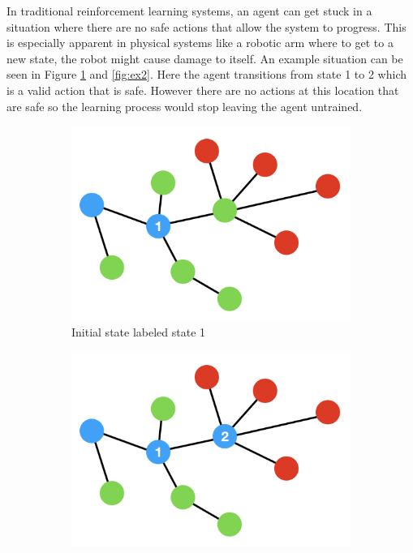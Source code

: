 \documentclass[acmsmall,review,authorversion]{acmart}
\begin{document}
In traditional reinforcement learning systems, an agent can get stuck in a situation where there are no safe actions that allow the system to progress. This is especially apparent in physical systems like a robotic arm where to get to a new state, the robot might cause damage to itself. An example situation can be seen in Figure \ref{fig:ex1} and \ref{fig:ex2}. Here the agent transitions from state 1 to 2 which is a valid action that is safe. However there are no actions at this location that are safe so the learning process would stop leaving the agent untrained.

    \begin{figure}[htb]
        \centering
        \begin{subfigure}{.5\textwidth}
          \centering
          \includegraphics[width=.8\linewidth]{assets/example_1.png}
          \caption{Initial state labeled state 1}
          \label{fig:ex1}
        \end{subfigure}%
        \begin{subfigure}{.5\textwidth}
          \centering
          \includegraphics[width=.8\linewidth]{assets/example_2.png}

\end{subfigure}
\end{figure}
\end{document}
